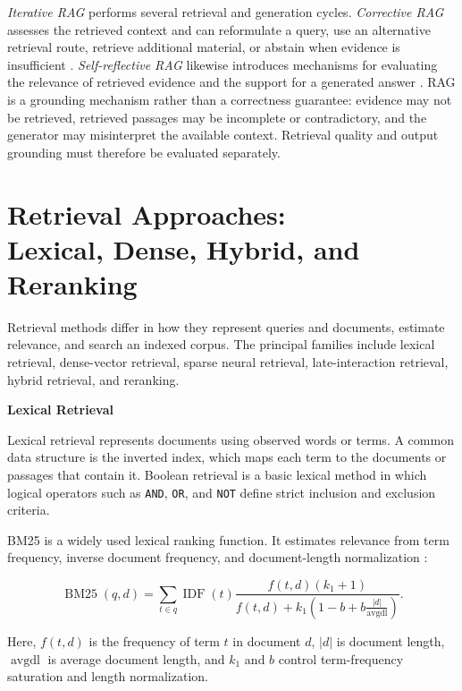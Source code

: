 \documentclass[12pt,a4paper]{report}
\numberwithin{equation}{chapter}
\begin{document}
\textit{Iterative RAG} performs several retrieval and generation cycles. \textit{Corrective RAG} assesses the retrieved context and can reformulate a query, use an alternative retrieval route, retrieve additional material, or abstain when evidence is insufficient \cite{Yan2024}. \textit{Self-reflective RAG} likewise introduces mechanisms for evaluating the relevance of retrieved evidence and the support for a generated answer \cite{Asai2024}. RAG is a grounding mechanism rather than a correctness guarantee: evidence may not be retrieved, retrieved passages may be incomplete or contradictory, and the generator may misinterpret the available context. Retrieval quality and output grounding must therefore be evaluated separately.

\section{Retrieval Approaches:\\ Lexical, Dense, Hybrid, and Reranking}

Retrieval methods differ in how they represent queries and documents, estimate relevance, and search an indexed corpus. The principal families include lexical retrieval, dense-vector retrieval, sparse neural retrieval, late-interaction retrieval, hybrid retrieval, and reranking.
\par\medskip
\textbf{Lexical Retrieval}

Lexical retrieval represents documents using observed words or terms. A common data structure is the inverted index, which maps each term to the documents or passages that contain it. Boolean retrieval is a basic lexical method in which logical operators such as \texttt{AND}, \texttt{OR}, and \texttt{NOT} define strict inclusion and exclusion criteria.

BM25 is a widely used lexical ranking function. It estimates relevance from term frequency, inverse document frequency, and document-length normalization \cite{Robertson2009}:

\begin{equation}
\label{eq:bm25}
\operatorname{BM25}(q,d)=
\sum_{t \in q}\operatorname{IDF}(t)
\frac{f(t,d)(k_1+1)}
{f(t,d)+k_1\left(1-b+b\frac{|d|}{\operatorname{avgdl}}\right)}.
\end{equation}

Here, \(f(t,d)\) is the frequency of term \(t\) in document \(d\), \(|d|\) is document length, \(\operatorname{avgdl}\) is average document length, and \(k_1\) and \(b\) control term-frequency saturation and length normalization.
\end{document}
